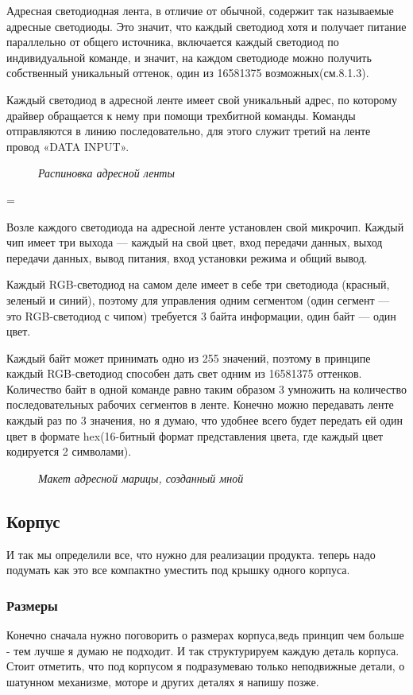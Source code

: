 \documentclass[a4paper, 12pt]{article}
\newcommand{\image}[3]{
	\begin{figure}[ht]
		\center{\texttt{[image: img/\#1]} }
		\caption{\textit{#3}}\end{figure}
}
\begin{document}
Адресная светодиодная лента, в отличие от обычной, содержит так называемые адресные
светодиоды. Это значит, что каждый светодиод хотя и получает питание параллельно от
общего источника, включается каждый светодиод по индивидуальной команде, и значит,
на каждом светодиоде можно получить собственный уникальный оттенок, один из 16581375
возможных(см.8.1.3).

Каждый светодиод в адресной ленте имеет свой уникальный адрес, по которому
драйвер обращается к нему при помощи трехбитной команды. Команды отправляются в
линию последовательно, для этого служит третий на ленте провод «DATA INPUT».

\image{лента.jpg}{80}{Распиновка адресной ленты}=

Возле каждого светодиода на адресной ленте установлен свой микрочип.
Каждый чип имеет три выхода — каждый на свой цвет, вход передачи данных,
выход передачи данных, вывод питания, вход установки режима и общий вывод.

Каждый RGB-светодиод на самом деле имеет в себе три светодиода (красный,
зеленый и синий), поэтому для управления одним сегментом (один сегмент — это
RGB-светодиод с чипом) требуется 3 байта информации, один байт — один цвет.

Каждый байт может принимать одно из 255 значений, поэтому в принципе каждый
RGB-светодиод способен дать свет одним из 16581375 оттенков. Количество байт
в одной команде равно таким образом 3 умножить на количество последовательных
рабочих сегментов в ленте. Конечно можно передавать ленте каждый раз по 3
значения, но я думаю, что удобнее всего будет передать ей один цвет в формате
hex(16-битный формат представления цвета, где каждый цвет кодируется 2 
символами).


\image{лента в тинкеркад.png}{180}{Макет адресной марицы, созданный мной}

\newpage

\subsection{Корпус}
И так мы определили все, что нужно для реализации продукта.
теперь надо подумать как это все компактно уместить под крышку
одного корпуса.
\subsubsection{Размеры}
Конечно сначала нужно поговорить о размерах корпуса,ведь принцип
чем больше - тем лучше я думаю не подходит. И так структурируем каждую
деталь корпуса. Стоит отметить, что под корпусом я подразумеваю только
неподвижные детали, о шатунном механизме, моторе и других деталях я
напишу позже.
\end{document}
